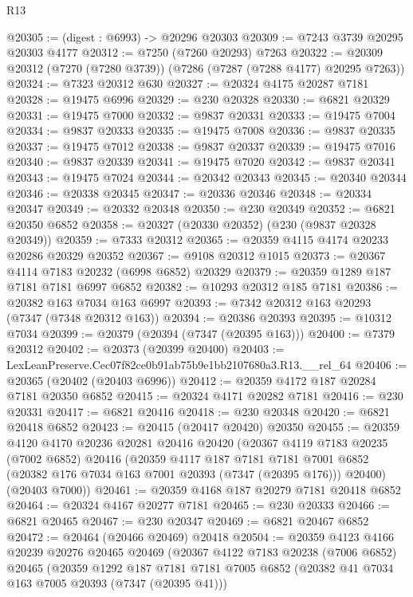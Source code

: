 \begin{lexlean}{R13}
\begin{coremodule}
@20305 := (digest : @6993) -> @20296 @20303
@20309 := @7243 @3739 @20295 @20303 @4177
@20312 := @7250 (@7260 @20293) @7263
@20322 := @20309 @20312 (@7270 (@7280 @3739)) (@7286 (@7287 (@7288 @4177) @20295 @7263))
@20324 := @7323 @20312 @630
@20327 := @20324 @4175 @20287 @7181
@20328 := @19475 @6996
@20329 := @230 @20328
@20330 := @6821 @20329
@20331 := @19475 @7000
@20332 := @9837 @20331
@20333 := @19475 @7004
@20334 := @9837 @20333
@20335 := @19475 @7008
@20336 := @9837 @20335
@20337 := @19475 @7012
@20338 := @9837 @20337
@20339 := @19475 @7016
@20340 := @9837 @20339
@20341 := @19475 @7020
@20342 := @9837 @20341
@20343 := @19475 @7024
@20344 := @20342 @20343
@20345 := @20340 @20344
@20346 := @20338 @20345
@20347 := @20336 @20346
@20348 := @20334 @20347
@20349 := @20332 @20348
@20350 := @230 @20349
@20352 := @6821 @20350 @6852
@20358 := @20327 (@20330 @20352) (@230 (@9837 @20328 @20349))
@20359 := @7333 @20312
@20365 := @20359 @4115 @4174 @20233 @20286 @20329 @20352
@20367 := @9108 @20312 @1015
@20373 := @20367 @4114 @7183 @20232 (@6998 @6852) @20329
@20379 := @20359 @1289 @187 @7181 @7181 @6997 @6852
@20382 := @10293 @20312 @185 @7181
@20386 := @20382 @163 @7034 @163 @6997
@20393 := @7342 @20312 @163 @20293 (@7347 (@7348 @20312 @163))
@20394 := @20386 @20393
@20395 := @10312 @7034
@20399 := @20379 (@20394 (@7347 (@20395 @163)))
@20400 := @7379 @20312
@20402 := @20373 (@20399 @20400)
@20403 := LexLeanPreserve.Cec07f82ce0b91ab75b9e1bb2107680a3.R13.__rel_64
@20406 := @20365 (@20402 (@20403 @6996))
@20412 := @20359 @4172 @187 @20284 @7181 @20350 @6852
@20415 := @20324 @4171 @20282 @7181
@20416 := @230 @20331
@20417 := @6821 @20416
@20418 := @230 @20348
@20420 := @6821 @20418 @6852
@20423 := @20415 (@20417 @20420) @20350
@20455 := @20359
    @4120
    @4170
    @20236
    @20281
    @20416
    @20420
    (@20367
      @4119
      @7183
      @20235
      (@7002 @6852)
      @20416
      (@20359
        @4117
        @187
        @7181
        @7181
        @7001
        @6852
        (@20382 @176 @7034 @163 @7001 @20393 (@7347 (@20395 @176)))
        @20400)
      (@20403 @7000))
@20461 := @20359 @4168 @187 @20279 @7181 @20418 @6852
@20464 := @20324 @4167 @20277 @7181
@20465 := @230 @20333
@20466 := @6821 @20465
@20467 := @230 @20347
@20469 := @6821 @20467 @6852
@20472 := @20464 (@20466 @20469) @20418
@20504 := @20359
    @4123
    @4166
    @20239
    @20276
    @20465
    @20469
    (@20367
      @4122
      @7183
      @20238
      (@7006 @6852)
      @20465
      (@20359
        @1292
        @187
        @7181
        @7181
        @7005
        @6852
        (@20382 @41 @7034 @163 @7005 @20393 (@7347 (@20395 @41)))

\end{coremodule}
\end{lexlean}
